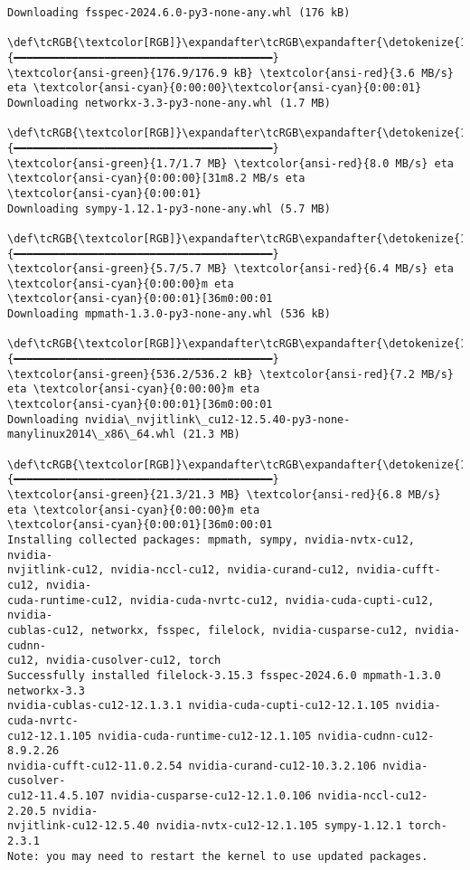 \documentclass[11pt]{article}
\begin{document}
\begin{Verbatim}[commandchars=\\\{\}]
Downloading fsspec-2024.6.0-py3-none-any.whl (176 kB)
   \def\tcRGB{\textcolor[RGB]}\expandafter\tcRGB\expandafter{\detokenize{114,156,31}}{━━━━━━━━━━━━━━━━━━━━━━━━━━━━━━━━━━━━━━━━}
\textcolor{ansi-green}{176.9/176.9 kB} \textcolor{ansi-red}{3.6 MB/s} eta \textcolor{ansi-cyan}{0:00:00}\textcolor{ansi-cyan}{0:00:01}
Downloading networkx-3.3-py3-none-any.whl (1.7 MB)
   \def\tcRGB{\textcolor[RGB]}\expandafter\tcRGB\expandafter{\detokenize{114,156,31}}{━━━━━━━━━━━━━━━━━━━━━━━━━━━━━━━━━━━━━━━━}
\textcolor{ansi-green}{1.7/1.7 MB} \textcolor{ansi-red}{8.0 MB/s} eta \textcolor{ansi-cyan}{0:00:00}[31m8.2 MB/s eta
\textcolor{ansi-cyan}{0:00:01}
Downloading sympy-1.12.1-py3-none-any.whl (5.7 MB)
   \def\tcRGB{\textcolor[RGB]}\expandafter\tcRGB\expandafter{\detokenize{114,156,31}}{━━━━━━━━━━━━━━━━━━━━━━━━━━━━━━━━━━━━━━━━}
\textcolor{ansi-green}{5.7/5.7 MB} \textcolor{ansi-red}{6.4 MB/s} eta \textcolor{ansi-cyan}{0:00:00}m eta
\textcolor{ansi-cyan}{0:00:01}[36m0:00:01
Downloading mpmath-1.3.0-py3-none-any.whl (536 kB)
   \def\tcRGB{\textcolor[RGB]}\expandafter\tcRGB\expandafter{\detokenize{114,156,31}}{━━━━━━━━━━━━━━━━━━━━━━━━━━━━━━━━━━━━━━━━}
\textcolor{ansi-green}{536.2/536.2 kB} \textcolor{ansi-red}{7.2 MB/s} eta \textcolor{ansi-cyan}{0:00:00}m eta
\textcolor{ansi-cyan}{0:00:01}[36m0:00:01
Downloading nvidia\_nvjitlink\_cu12-12.5.40-py3-none-
manylinux2014\_x86\_64.whl (21.3 MB)
   \def\tcRGB{\textcolor[RGB]}\expandafter\tcRGB\expandafter{\detokenize{114,156,31}}{━━━━━━━━━━━━━━━━━━━━━━━━━━━━━━━━━━━━━━━━}
\textcolor{ansi-green}{21.3/21.3 MB} \textcolor{ansi-red}{6.8 MB/s} eta \textcolor{ansi-cyan}{0:00:00}m eta
\textcolor{ansi-cyan}{0:00:01}[36m0:00:01
Installing collected packages: mpmath, sympy, nvidia-nvtx-cu12, nvidia-
nvjitlink-cu12, nvidia-nccl-cu12, nvidia-curand-cu12, nvidia-cufft-cu12, nvidia-
cuda-runtime-cu12, nvidia-cuda-nvrtc-cu12, nvidia-cuda-cupti-cu12, nvidia-
cublas-cu12, networkx, fsspec, filelock, nvidia-cusparse-cu12, nvidia-cudnn-
cu12, nvidia-cusolver-cu12, torch
Successfully installed filelock-3.15.3 fsspec-2024.6.0 mpmath-1.3.0 networkx-3.3
nvidia-cublas-cu12-12.1.3.1 nvidia-cuda-cupti-cu12-12.1.105 nvidia-cuda-nvrtc-
cu12-12.1.105 nvidia-cuda-runtime-cu12-12.1.105 nvidia-cudnn-cu12-8.9.2.26
nvidia-cufft-cu12-11.0.2.54 nvidia-curand-cu12-10.3.2.106 nvidia-cusolver-
cu12-11.4.5.107 nvidia-cusparse-cu12-12.1.0.106 nvidia-nccl-cu12-2.20.5 nvidia-
nvjitlink-cu12-12.5.40 nvidia-nvtx-cu12-12.1.105 sympy-1.12.1 torch-2.3.1
Note: you may need to restart the kernel to use updated packages.
    \end{Verbatim}
\end{document}
